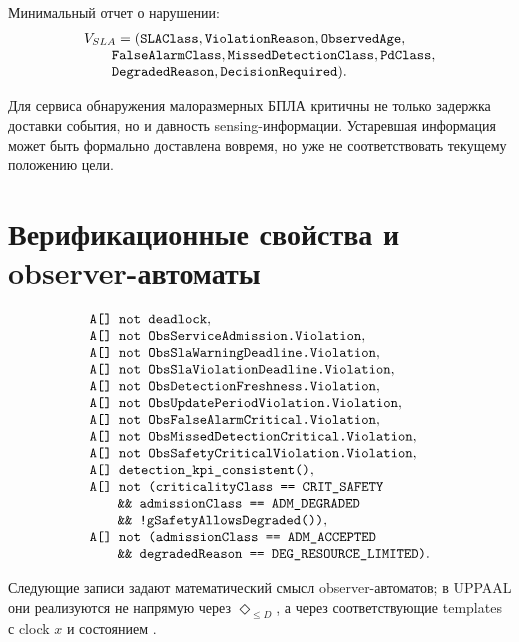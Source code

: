 \documentclass[10pt,a4paper]{article}
\newcommand{\code}[1]{\ifmmode\text{\ttfamily\detokenize{#1}}\else\texttt{\detokenize{#1}}\fi}
\begin{document}
Минимальный отчет о нарушении:
\[
\begin{array}{l}
V_{SLA}=(\code{SLAClass},\code{ViolationReason},\code{ObservedAge},\\
\qquad \code{FalseAlarmClass},\code{MissedDetectionClass},\code{PdClass},\\
\qquad \code{DegradedReason},\code{DecisionRequired}).
\end{array}
\]

Для сервиса обнаружения малоразмерных БПЛА критичны не только задержка доставки события, но и давность sensing-информации. Устаревшая информация может быть формально доставлена вовремя, но уже не соответствовать текущему положению цели.

\section{Верификационные свойства и observer-автоматы}

\[
\begin{array}{l}
\code{A[] not deadlock},\\
\code{A[] not ObsServiceAdmission.Violation},\\
\code{A[] not ObsSlaWarningDeadline.Violation},\\
\code{A[] not ObsSlaViolationDeadline.Violation},\\
\code{A[] not ObsDetectionFreshness.Violation},\\
\code{A[] not ObsUpdatePeriodViolation.Violation},\\
\code{A[] not ObsFalseAlarmCritical.Violation},\\
\code{A[] not ObsMissedDetectionCritical.Violation},\\
\code{A[] not ObsSafetyCriticalViolation.Violation},\\
\code{A[] detection_kpi_consistent()},\\
\code{A[] not (criticalityClass == CRIT_SAFETY}\\
\qquad \code{&& admissionClass == ADM_DEGRADED}\\
\qquad \code{&& !gSafetyAllowsDegraded())},\\
\code{A[] not (admissionClass == ADM_ACCEPTED}\\
\qquad \code{&& degradedReason == DEG_RESOURCE_LIMITED)}.
\end{array}
\]

Следующие записи задают математический смысл observer-автоматов; в UPPAAL они реализуются не напрямую через \(\Diamond_{\le D}\), а через соответствующие templates с clock \(x\) и состоянием \code{Violation}.
\end{document}
